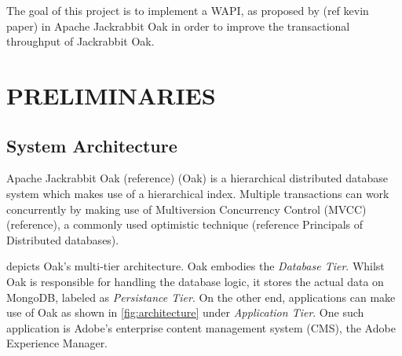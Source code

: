 \documentclass[abstracton,12pt]{scrreprt}
\begin{document}
The goal of this project is to implement a WAPI, as proposed by (ref kevin paper) in Apache Jackrabbit Oak in order to improve the transactional throughput of Jackrabbit Oak.

\chapter{PRELIMINARIES}

\section{System Architecture}

Apache Jackrabbit Oak (reference) (Oak) is a hierarchical distributed database system which makes use of a hierarchical index. 
Multiple transactions can work concurrently by making use of Multiversion Concurrency Control (MVCC) (reference), a commonly used optimistic technique (reference Principals of Distributed databases).

 depicts Oak's multi-tier architecture.
Oak embodies the \textit{Database Tier}.
Whilst Oak is responsible for handling the database logic, it stores the actual data on MongoDB, labeled as \textit{Persistance Tier}.
On the other end, applications can make use of Oak as shown in \cref{fig:architecture} under \textit{Application Tier}.
One such application is Adobe's enterprise content management system (CMS), the Adobe Experience Manager.
\end{document}
